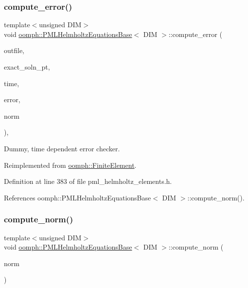 \subsubsection{\texorpdfstring{compute\+\_\+error()}{compute\_error()}\hspace{0.1cm}{\footnotesize\ttfamily [2/2]}}
{\footnotesize\ttfamily template$<$unsigned D\+IM$>$ \\
void \hyperlink{classoomph_1_1PMLHelmholtzEquationsBase}{oomph\+::\+P\+M\+L\+Helmholtz\+Equations\+Base}$<$ D\+IM $>$\+::compute\+\_\+error (\begin{DoxyParamCaption}\item[{std\+::ostream \&}]{outfile,  }\item[{\hyperlink{classoomph_1_1FiniteElement_ad4ecf2b61b158a4b4d351a60d23c633e}{Finite\+Element\+::\+Unsteady\+Exact\+Solution\+Fct\+Pt}}]{exact\+\_\+soln\+\_\+pt,  }\item[{const double \&}]{time,  }\item[{double \&}]{error,  }\item[{double \&}]{norm }\end{DoxyParamCaption})\hspace{0.3cm}{\ttfamily [inline]}, {\ttfamily [virtual]}}



Dummy, time dependent error checker. 



Reimplemented from \hyperlink{classoomph_1_1FiniteElement_a7f67853506dc73fa6b7505108de22d1f}{oomph\+::\+Finite\+Element}.



Definition at line 383 of file pml\+\_\+helmholtz\+\_\+elements.\+h.



References oomph\+::\+P\+M\+L\+Helmholtz\+Equations\+Base$<$ D\+I\+M $>$\+::compute\+\_\+norm().

\mbox{\label{classoomph_1_1PMLHelmholtzEquationsBase_ae426e5240fc08c0bee0f34862b22b286}} 
\subsubsection{\texorpdfstring{compute\+\_\+norm()}{compute\_norm()}}
{\footnotesize\ttfamily template$<$unsigned D\+IM$>$ \\
void \hyperlink{classoomph_1_1PMLHelmholtzEquationsBase}{oomph\+::\+P\+M\+L\+Helmholtz\+Equations\+Base}$<$ D\+IM $>$\+::compute\+\_\+norm (\begin{DoxyParamCaption}\item[{double \&}]{norm }\end{DoxyParamCaption})\hspace{0.3cm}{\ttfamily [virtual]}}



